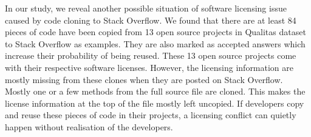 \documentclass{sig-alternate-05-2015}
\begin{document}
In our study, we reveal another possible situation of software licensing issue caused by code cloning to Stack Overflow. We found that there are at least 84 pieces of code have been copied from 13 open source projects in Qualitas dataset to Stack Overflow as examples. They are also marked as accepted answers which increase their probability of being reused. These 13 open source projects come with their respective software licenses. However, the licensing information are mostly missing from these clones when they are posted on Stack Overflow. Mostly one or a few methods from the full source file are cloned. This makes the license information at the top of the file mostly left uncopied. If developers copy and reuse these pieces of code in their projects, a licensing conflict can quietly happen without realisation of the developers. 
\end{document}
